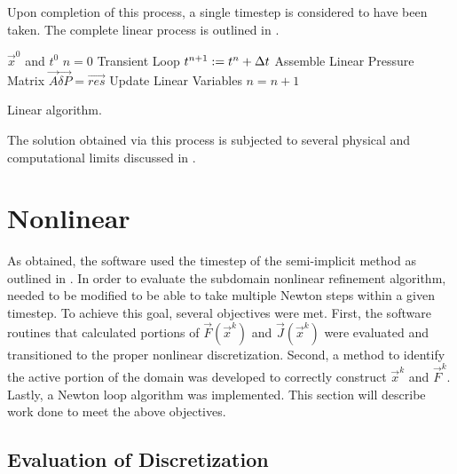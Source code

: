 Upon completion of this process, a single timestep is considered to have been taken.
The complete linear process is outlined in .

\begin{algo}[ht!]
\setlength{\baselineskip}{0.625\baselineskip}
\begin{algorithmic}[1]
\Require $\vec{x}^{0}$ and $t^{0}$
\Set $n = 0$
\Loop \; Transient Loop
    \Set $t^{n+1} : = t^{n} + \dt{}$
	\Algorithm Assemble Linear Pressure Matrix 
   	\Solve $\vec{A} \vec{\delta P} = \vec{res}$
	\Algorithm Update Linear Variables 
	\Set $n = n + 1$
\EndLoop
\end{algorithmic}
\caption{Linear \cobra{} algorithm.}
\label{alg:linCobraAlgorithm}
\end{algo}

The solution obtained via this process is subjected to several physical and computational limits discussed in .

\section{Nonlinear \cobra{}}
\label{sect:nlnCobraSolver}
As obtained, the \cobra{} software used the timestep of the semi-implicit method as outlined in .
In order to evaluate the subdomain nonlinear refinement algorithm, \cobra{} needed to be modified to be able to take multiple Newton steps within a given timestep.
To achieve this goal, several objectives were met.
First, the software routines that calculated portions of $\vec{F}(\vec{x}^{k})$ and $\vec{J}(\vec{x}^{k})$ were evaluated and transitioned to the proper nonlinear discretization.
Second, a method to identify the active portion of the domain was developed to correctly construct $\vec{x}^{k}$ and $\vec{F}^{k}$.
Lastly, a Newton loop algorithm was implemented.
This section will describe work done to meet the above objectives.

\subsection{Evaluation of Discretization}
\label{subsect:nonlinearDiscretization}

